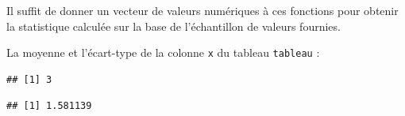 \documentclass[
  11pt,
]{book}
\newenvironment{Shaded}{\begin{snugshade}}{\end{snugshade}}
\newcommand{\FunctionTok}[1]{\textcolor[rgb]{0.00,0.00,0.00}{#1}}
\newcommand{\NormalTok}[1]{#1}
\newcommand{\SpecialCharTok}[1]{\textcolor[rgb]{0.00,0.00,0.00}{#1}}
\numberwithin{equation}{section}
\numberwithin{countremarque}{section}
\begin{document}
Il suffit de donner un vecteur de valeurs numériques à ces fonctions pour obtenir la statistique calculée sur la base de l'échantillon de valeurs fournies.

La moyenne et l'écart-type de la colonne \texttt{x} du tableau \texttt{tableau} :

\begin{Shaded}
\end{Shaded}

\begin{lstlisting}
## [1] 3
\end{lstlisting}

\begin{Shaded}
\end{Shaded}

\begin{lstlisting}
## [1] 1.581139
\end{lstlisting}
\end{document}

